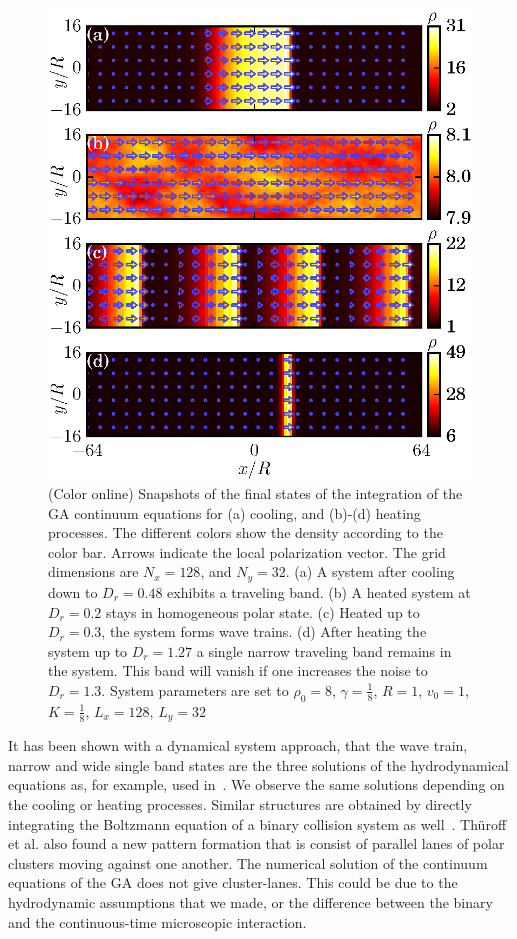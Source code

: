 \documentclass[reprint,floatfix,amsmath,amssymb,aps,pre,showkeys,showpacs,superscriptaddress]{revtex4-1}
\newcommand{\hl}[1]{\textcolor{hlcolor}{#1}}
\begin{document}
\begin{figure}
	\centering
	\includegraphics[width=\columnwidth]{Fig6_snapshots-ga}
	\caption{(Color online) Snapshots \hl{of the final states of the} integration of the GA continuum equations for (a) cooling, and (b)-(d) heating \hl{processes}. The different colors \hl{show} the density according to the color bar. Arrows indicate the local polarization vector. The grid dimensions are $N_x=128$, and $N_y=32$. (a) A system after cooling down to $D_r=0.48$ exhibits a traveling band. (b) A heated system at $D_r=0.2$ stays in homogeneous polar state. (c) Heated up to $D_r=0.3$, the system \hl{forms} wave trains. (d) After heating the system up to $D_r=1.27$ a single narrow traveling band \hl{remains} in the system. This band will vanish if one increases the noise to $D_r=1.3$. System parameters are set to $\rho_0=8$, $\gamma=\tfrac{1}{8}$, $R=1$, $v_0=1$, $K=\tfrac{1}{8}$, $L_x=128$, $L_y=32$}
\label{fig:snapshots-ga}
\end{figure}

\hl{It has been shown with a dynamical system approach, that the wave train, narrow and wide single band states are the three solutions of the hydrodynamical equations as, for example, used in~\cite{caussin2014}. We observe the same solutions depending on the cooling or heating processes.} Similar structures are obtained by directly integrating the Boltzmann equation of a binary collision system as well~\cite{thuroff2014numerical}. \hl{Th{\"u}roff et al.} also found a new pattern formation that is consist of parallel lanes of polar clusters moving against one another. The numerical solution of the continuum equations of the GA does not give cluster-lanes. This could be due to the hydrodynamic assumptions that we made, or the difference between the binary and the continuous-time microscopic interaction.
\end{document}
